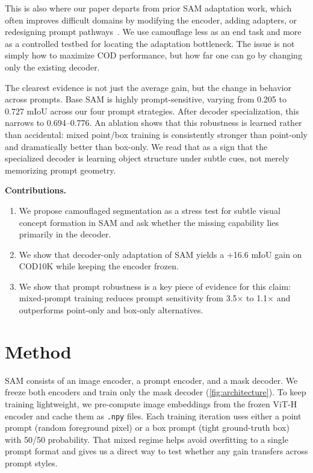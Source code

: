 \documentclass[10pt,twocolumn,letterpaper]{article}
\begin{document}
This is also where our paper departs from prior SAM adaptation work, which often improves difficult domains by modifying the encoder, adding adapters, or redesigning prompt pathways~\cite{chen2023samadapter,hao2024comprompter}. We use camouflage less as an end task and more as a controlled testbed for locating the adaptation bottleneck. The issue is not simply how to maximize COD performance, but how far one can go by changing only the existing decoder.

The clearest evidence is not just the average gain, but the change in behavior across prompts. Base SAM is highly prompt-sensitive, varying from 0.205 to 0.727 mIoU across our four prompt strategies. After decoder specialization, this narrows to 0.694--0.776. An ablation shows that this robustness is learned rather than accidental: mixed point/box training is consistently stronger than point-only and dramatically better than box-only. We read that as a sign that the specialized decoder is learning object structure under subtle cues, not merely memorizing prompt geometry.

\noindent\textbf{Contributions.}
\begin{enumerate}
    \item We propose camouflaged segmentation as a stress test for subtle visual concept formation in SAM and ask whether the missing capability lies primarily in the decoder.
    \item We show that decoder-only adaptation of SAM yields a +16.6 mIoU gain on COD10K while keeping the encoder frozen.
    \item We show that prompt robustness is a key piece of evidence for this claim: mixed-prompt training reduces prompt sensitivity from 3.5$\times$ to 1.1$\times$ and outperforms point-only and box-only alternatives.
\end{enumerate}

\section{Method}
SAM consists of an image encoder, a prompt encoder, and a mask decoder. We freeze both encoders and train only the mask decoder (\cref{fig:architecture}). To keep training lightweight, we pre-compute image embeddings from the frozen ViT-H encoder and cache them as \texttt{.npy} files. Each training iteration uses either a point prompt (random foreground pixel) or a box prompt (tight ground-truth box) with 50/50 probability. That mixed regime helps avoid overfitting to a single prompt format and gives us a direct way to test whether any gain transfers across prompt styles.
\end{document}
